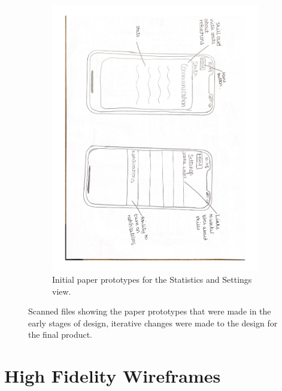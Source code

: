 \documentclass{l4proj}
\begin{document}
\begin{appendices}
\begin{figure}[H]
\begin{subfigure}[b]{1\textwidth}
        \includegraphics[scale=0.3, angle = 90]{images/PaperWireframes2.pdf}
        \caption{Initial paper prototypes for the Statistics and Settings view.}
        \label{fig:PaperPrototype2}
    \end{subfigure}     
    \caption{Scanned files showing the paper prototypes that were made in the early stages of design, iterative changes were made to the design for the final product.}
    \label{fig:PaperPrototypes}
\end{figure}

%

\section{High Fidelity Wireframes}\label{Appendix-highFidelityWireframes}


\end{appendices}
\end{document}
